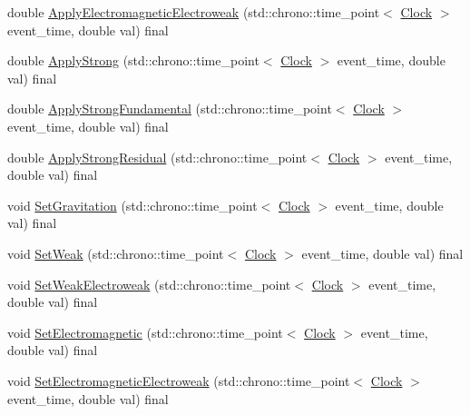 \begin{DoxyCompactItemize}
double \mbox{\hyperlink{classDimension_ab13e8ed50a4373274636e542c917db01}{Apply\+Electromagnetic\+Electroweak}} (std\+::chrono\+::time\+\_\+point$<$ \mbox{\hyperlink{universe_8h_a0ef8d951d1ca5ab3cfaf7ab4c7a6fd80}{Clock}} $>$ event\+\_\+time, double val) final
\item 
double \mbox{\hyperlink{classDimension_a621e8f7f24db86e836c5b3da0f019290}{Apply\+Strong}} (std\+::chrono\+::time\+\_\+point$<$ \mbox{\hyperlink{universe_8h_a0ef8d951d1ca5ab3cfaf7ab4c7a6fd80}{Clock}} $>$ event\+\_\+time, double val) final
\item 
double \mbox{\hyperlink{classDimension_afb01fb9e469da18899d4b14e5f095ece}{Apply\+Strong\+Fundamental}} (std\+::chrono\+::time\+\_\+point$<$ \mbox{\hyperlink{universe_8h_a0ef8d951d1ca5ab3cfaf7ab4c7a6fd80}{Clock}} $>$ event\+\_\+time, double val) final
\item 
double \mbox{\hyperlink{classDimension_a2ae0b6a8ee17f6e28b6d2d3209df4bf4}{Apply\+Strong\+Residual}} (std\+::chrono\+::time\+\_\+point$<$ \mbox{\hyperlink{universe_8h_a0ef8d951d1ca5ab3cfaf7ab4c7a6fd80}{Clock}} $>$ event\+\_\+time, double val) final
\item 
void \mbox{\hyperlink{classDimension_aeec6887382d09e3d78382582ff4e7c33}{Set\+Gravitation}} (std\+::chrono\+::time\+\_\+point$<$ \mbox{\hyperlink{universe_8h_a0ef8d951d1ca5ab3cfaf7ab4c7a6fd80}{Clock}} $>$ event\+\_\+time, double val) final
\item 
void \mbox{\hyperlink{classDimension_a157cfa28dd6bc5518d622d01445ca827}{Set\+Weak}} (std\+::chrono\+::time\+\_\+point$<$ \mbox{\hyperlink{universe_8h_a0ef8d951d1ca5ab3cfaf7ab4c7a6fd80}{Clock}} $>$ event\+\_\+time, double val) final
\item 
void \mbox{\hyperlink{classDimension_a1d2accef9e6adf747f5cc143ae4527c9}{Set\+Weak\+Electroweak}} (std\+::chrono\+::time\+\_\+point$<$ \mbox{\hyperlink{universe_8h_a0ef8d951d1ca5ab3cfaf7ab4c7a6fd80}{Clock}} $>$ event\+\_\+time, double val) final
\item 
void \mbox{\hyperlink{classDimension_ad8c18ce6358904e01594092dca9f1311}{Set\+Electromagnetic}} (std\+::chrono\+::time\+\_\+point$<$ \mbox{\hyperlink{universe_8h_a0ef8d951d1ca5ab3cfaf7ab4c7a6fd80}{Clock}} $>$ event\+\_\+time, double val) final
\item 
void \mbox{\hyperlink{classDimension_aead73fc6a25388d14b514b2170735b1b}{Set\+Electromagnetic\+Electroweak}} (std\+::chrono\+::time\+\_\+point$<$ \mbox{\hyperlink{universe_8h_a0ef8d951d1ca5ab3cfaf7ab4c7a6fd80}{Clock}} $>$ event\+\_\+time, double val) final
\item 

\end{DoxyCompactItemize}
